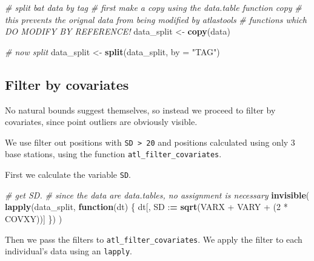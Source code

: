 \documentclass[
]{scrartcl}
\newenvironment{Shaded}{}{}
\newcommand{\CommentTok}[1]{\textcolor[rgb]{0.38,0.63,0.69}{\textit{#1}}}
\newcommand{\ControlFlowTok}[1]{\textcolor[rgb]{0.00,0.44,0.13}{\textbf{#1}}}
\newcommand{\DataTypeTok}[1]{\textcolor[rgb]{0.56,0.13,0.00}{#1}}
\newcommand{\DecValTok}[1]{\textcolor[rgb]{0.25,0.63,0.44}{#1}}
\newcommand{\ErrorTok}[1]{\textcolor[rgb]{1.00,0.00,0.00}{\textbf{#1}}}
\newcommand{\KeywordTok}[1]{\textcolor[rgb]{0.00,0.44,0.13}{\textbf{#1}}}
\newcommand{\NormalTok}[1]{#1}
\newcommand{\OperatorTok}[1]{\textcolor[rgb]{0.40,0.40,0.40}{#1}}
\newcommand{\StringTok}[1]{\textcolor[rgb]{0.25,0.44,0.63}{#1}}
\begin{document}
\begin{Shaded}
\begin{Highlighting}[]
\CommentTok{\# split bat data by tag}
\CommentTok{\# first make a copy using the data.table function copy}
\CommentTok{\# this prevents the orignal data from being modified by atlastools}
\CommentTok{\# functions which DO MODIFY BY REFERENCE!}
\NormalTok{data\_split <{-}}\StringTok{ }\KeywordTok{copy}\NormalTok{(data)}

\CommentTok{\# now split}
\NormalTok{data\_split <{-}}\StringTok{ }\KeywordTok{split}\NormalTok{(data\_split, }\DataTypeTok{by =} \StringTok{"TAG"}\NormalTok{)}
\end{Highlighting}
\end{Shaded}

\hypertarget{filter-by-covariates}{%
\subsection{Filter by covariates}\label{filter-by-covariates}}

No natural bounds suggest themselves, so instead we proceed to filter by covariates, since point outliers are obviously visible.

We use filter out positions with \texttt{SD\ \textgreater{}\ 20} and positions calculated using only 3 base stations, using the function \texttt{atl\_filter\_covariates}.

First we calculate the variable \texttt{SD}.

\begin{Shaded}
\begin{Highlighting}[]
\CommentTok{\# get SD.}
\CommentTok{\# since the data are data.tables, no assignment is necessary}
\KeywordTok{invisible}\NormalTok{(}
  \KeywordTok{lapply}\NormalTok{(data\_split, }\ControlFlowTok{function}\NormalTok{(dt) \{}
\NormalTok{    dt[, SD }\OperatorTok{:}\ErrorTok{=}\StringTok{ }\KeywordTok{sqrt}\NormalTok{(VARX }\OperatorTok{+}\StringTok{ }\NormalTok{VARY }\OperatorTok{+}\StringTok{ }\NormalTok{(}\DecValTok{2} \OperatorTok{*}\StringTok{ }\NormalTok{COVXY))]}
\NormalTok{  \})}
\NormalTok{)}
\end{Highlighting}
\end{Shaded}

Then we pass the filters to \texttt{atl\_filter\_covariates}.
We apply the filter to each individual's data using an \texttt{lapply}.
\end{document}
